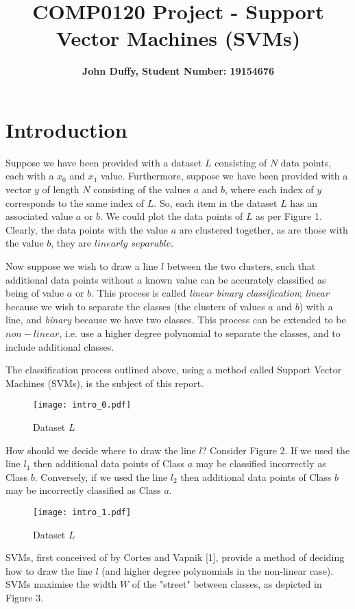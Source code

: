 \documentclass[10pt, a4paper]{amsart}
\title{COMP0120 Project - Support Vector Machines (SVM\MakeLowercase{s})}
\author{\textbf{John Duffy, Student Number: 19154676}}
\begin{document}
\maketitle

\section{Introduction}

Suppose we have been provided with a dataset $L$ consisting of $N$ data points, each with a $x_0$ and $x_1$ value. Furthermore, suppose we have been provided with a vector $y$ of length $N$ consisting of the values $a$ and $b$, where each index of $y$ corresponds to the same index of $L$. So, each item in the dataset $L$ has an associated value $a$ or $b$. We could plot the data points of $L$ as per Figure 1. Clearly, the data points with the value $a$ are clustered together, as are those with the value $b$, they are $linearly$  $separable$.

Now suppose we wish to draw a line $l$ between the two clusters, such that additional data points without a known value can be accurately classified as being of value $a$ or $b$. This process is called \emph{linear binary classification}; \emph{linear} because we wish to separate the classes (the clusters of values $a$ and $b$) with a line, and \emph{binary} because we have two classes. This process can be extended to be $non-linear$, i.e. use a higher degree polynomial to separate the classes, and to include additional classes.  

The classification process outlined above, using a method called Support Vector Machines (SVMs), is the subject of this report.

\begin{figure}
	\centering	
	\texttt{[image: intro\_0.pdf]}
	\caption{Dataset $L$}
\end{figure}

How should we decide where to draw the line $l$? Consider Figure 2. If we used the line $l_1$ then additional data points of Class $a$ may be classified incorrectly as Class $b$. Conversely, if we used the line $l_2$ then additional data points of Class $b$ may be incorrectly classified as Class $a$.

\begin{figure}
	\centering	
	\texttt{[image: intro\_1.pdf]}
	\caption{Dataset $L$}
\end{figure}

SVMs, first conceived of by Cortes and Vapnik [1], provide a method of deciding how to draw the line $l$ (and higher degree polynomials in the non-linear case). SVMs maximise the width $W$ of the "street" between classes, as depicted in Figure 3.
\end{document}
